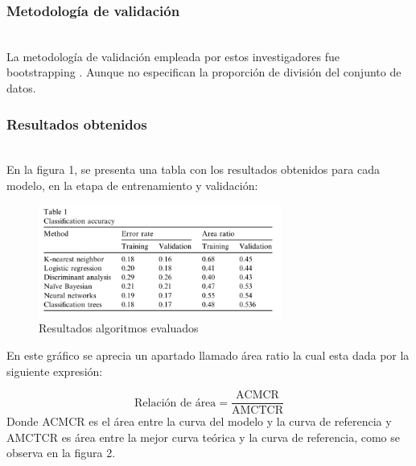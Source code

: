 \documentclass[conference]{IEEEtran}
\begin{document}
\subsubsection{Metodología de validación} \hfill\\
La metodología de validación empleada por estos investigadores fue bootstrapping \cite{boostrap}. Aunque no especifican la proporción de división del conjunto de datos.
\hfill\\
\subsubsection{Resultados obtenidos}\hfill\\
En la figura 1, se presenta una tabla con los resultados obtenidos para cada modelo, en la etapa de entrenamiento y validación:

\begin{center}
    \begin{figure}[H]
        \hfill
            \includegraphics[width=8cm]{resultadosArticulo1.png}\hspace*{\fill}
    \caption{Resultados algoritmos evaluados}
    \label{fig:login}
    \end{figure}  
\end{center}

En este gráfico se aprecia un apartado llamado área ratio la cual esta dada por la siguiente expresión: \newline

\[
 \text{Relación de área} = \frac{\text{ACMCR}}{\text{AMCTCR}}
\]\newline
Donde ACMCR es el área entre la curva del modelo y la curva de referencia y AMCTCR es área entre la mejor curva teórica y la curva de referencia, como se observa en la figura 2.
\end{document}
